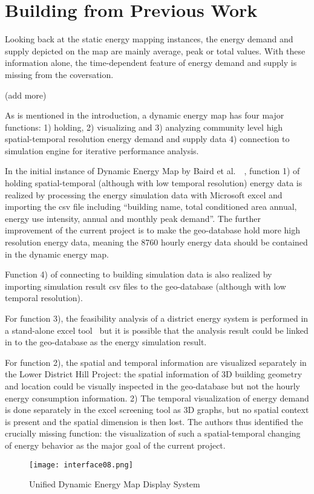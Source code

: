
\chapter{Building from Previous Work} %

\label{Chapter3} %


Looking back at the static energy mapping instances, the energy demand
and supply depicted on the map are mainly average, peak or total
values. With these information alone, the time-dependent feature of
energy demand and supply is missing from the coversation.

(add more)

As is mentioned in the introduction, a dynamic energy map has four
major functions: 1) holding, 2) visualizing and 3) analyzing community
level high spatial-temporal resolution energy demand and supply data
4) connection to simulation engine for iterative performance
analysis. 

In the initial instance of Dynamic Energy Map by Baird et al.\
~\cite{baird2014}, function 1) of holding spatial-temporal (although
with low temporal resolution) energy data is realized by processing
the energy simulation data with Microsoft excel and importing the csv
file including ``building name, total conditioned area annual, energy
use intensity, annual and monthly peak demand''. The further
improvement of the current project is to make the geo-database hold
more high resolution energy data, meaning the 8760 hourly energy data
should be contained in the dynamic energy map.

Function 4) of connecting to building simulation data is also realized
by importing simulation result csv files to the geo-database (although
with low temporal resolution).

For function 3), the feasibility analysis of a district energy system
is performed in a stand-alone excel tool~\cite{baird2014} but it is
possible that the analysis result could be linked in to the
geo-database as the energy simulation result. 

For function 2), the spatial and temporal information are visualized
separately in the Lower District Hill Project: the spatial information
of 3D building geometry and location could be visually inspected in
the geo-database but not the hourly energy consumption information. 2)
The temporal visualization of energy demand is done separately in the
excel screening tool as 3D graphs, but no spatial context is present
and the spatial dimension is then lost. The authors thus identified
the crucially missing function: the visualization of such a
spatial-temporal changing of energy behavior as the major goal of the
current project.

\begin{figure}[h!]
  \centering
  \texttt{[image: interface08.png]}
  \caption[Dynamic Energy Map Display]{Unified Dynamic Energy Map
    Display System}
  \label{fig:interface08}
\end{figure}